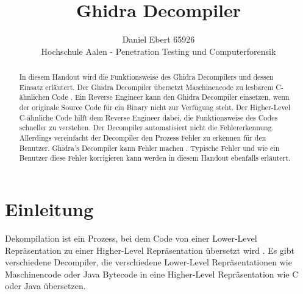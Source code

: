 \usepackage{filecontents}





\date{}

\title{\Large \bf Ghidra Decompiler}

\author{
{\rm Daniel Ebert 65926}\\
Hochschule Aalen - Penetration Testing und Computerforensik
}

\maketitle

\begin{abstract}

In diesem Handout wird die Funktionsweise des Ghidra Decompilers und dessen Einsatz erläutert. Der Ghidra Decompiler übersetzt Maschinencode zu lesbarem C-ähnlichen Code \cite{8}. Ein Reverse Engineer kann den Ghidra Decompiler einsetzen, wenn der originale Source Code für ein Binary nicht zur Verfügung steht. Der Higher-Level C-ähnliche Code hilft dem Reverse Engineer dabei, die Funktionsweise des Codes schneller zu verstehen. Der Decompiler automatisiert nicht die Fehlererkennung. Allerdings vereinfacht der Decompiler den Prozess Fehler zu erkennen für den Benutzer. Ghidra's Decompiler kann Fehler machen \cite{8} \cite{1}. Typische Fehler und wie ein Benutzer diese Fehler korrigieren kann werden in diesem Handout ebenfalls erläutert.


\end{abstract}


\section{Einleitung}

Dekompilation ist ein Prozess, bei dem Code von einer Lower-Level Repräsentation zu einer Higher-Level Repräsentation übersetzt wird \cite{12} \cite{22}. Es gibt verschiedene Decompiler, die verschiedene Lower-Level Repräsentationen wie Maschinencode oder Java Bytecode in eine Higher-Level Repräsentation wie C oder Java übersetzen.

